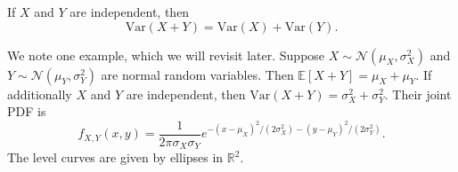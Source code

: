 \documentclass{ximera}
\begin{document}
\begin{theorem}
If $X$ and $Y$ are independent, then
$$
\mathrm{Var}(X+Y) = \mathrm{Var}(X) + \mathrm{Var}(Y).
$$
\end{theorem}

We note one example, which we will revisit later. Suppose $X \sim \mathcal{N}(\mu_X,\sigma_X^2)$ and $Y \sim \mathcal{N}(\mu_Y, \sigma_Y^2)$ are normal random variables. Then $\mathbb{E}[X+Y] = \mu_X + \mu_Y$. If additionally $X$ and $Y$ are independent, then $\mathrm{Var}(X+Y) = \sigma_X^2 + \sigma_Y^2$. Their joint PDF is 
$$
f_{X,Y}(x,y) = \frac{1}{2 \pi \sigma_X \sigma_Y} e^{-(x-\mu_X)^2/(2\sigma_X^2) - (y - \mu_Y)^2/(2\sigma_Y^2)}.
$$
The level curves are given by ellipses in $\mathbb{R}^2$.


\newpage
\end{document}

